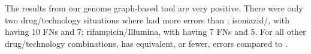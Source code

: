 

The results from our genome graph-based tool \drprg{} are very positive. There were only two drug/technology situations where \drprg{} had more errors than \mykrobe{}; isoniazid/\ont{}, with \drprg{} having 10 FNs and \mykrobe{} 7; rifampicin/Illumina, with \drprg{} having 7 FNs and \mykrobe{} 5. For all other drug/technology combinations, \drprg{} has equivalent, or fewer, errors compared to \mykrobe{}.

